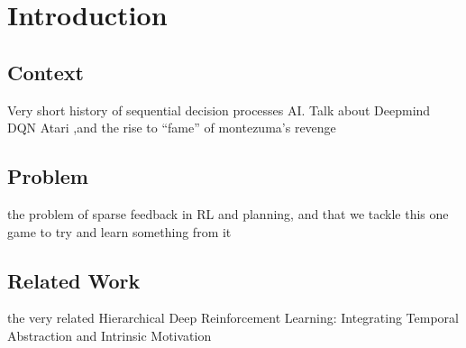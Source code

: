 \chapter{Introduction}
  \section{Context}
  Very short history of sequential decision processes AI. Talk about Deepmind DQN Atari ,and the rise to ``fame'' of montezuma's revenge
  \section{Problem}
   the problem of sparse feedback in RL and planning, and that we tackle this one game  to try and learn something from it
  \section{Related Work}
  the very related Hierarchical Deep Reinforcement Learning: Integrating
  Temporal Abstraction and Intrinsic Motivation \cite{kulkarni2016hierarchical}


